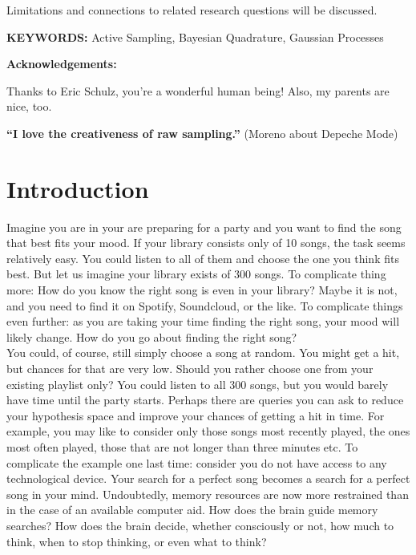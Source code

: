 \documentclass[oneside, 11pt]{book}
\begin{document}
Limitations and connections to related research questions will be discussed.\bigskip\\
\begin{center}
\textbf{KEYWORDS:} Active Sampling, Bayesian Quadrature, Gaussian Processes
\end{center}
\newpage
\vspace*{1cm}
\begin{center}
\textbf{{\LARGE Acknowledgements:}}\\
\end{center}
Thanks to Eric Schulz, you're a wonderful human being! Also, my parents are nice, too.
\newpage
\vspace*{10cm}
\begin{center}
\textbf{\Large{``I love the creativeness of raw sampling.''}} (Moreno about Depeche Mode)
\end{center}
\newpage
\tableofcontents
\newpage
\chapter{Introduction}
Imagine you are in your are preparing for a party and you want to find the song that best fits your mood. If your library consists only of 10 songs, the task seems relatively easy. You could listen to all of them and choose the one you think fits best. But let us imagine your library exists of 300 songs. To complicate thing more: How do you know the right song is even in your library? Maybe it is not, and you need to find it on Spotify, Soundcloud, or the like. To complicate things even further: as you are taking your time finding the right song, your mood will likely change. How do you go about finding the right song?\\
 
You could, of course, still simply choose a song at random. You might get a hit, but chances for that are very low. Should you rather choose one from your existing playlist only? You could listen to all 300 songs, but you would barely have time until the party starts. Perhaps there are queries you can ask to reduce your hypothesis space and improve your chances of getting a hit in time. For example, you may like to consider only those songs most recently played, the ones most often played, those that are not longer than three minutes etc. To complicate the example one last time: consider you do not have access to any technological device. Your search for a perfect song becomes a search for a perfect song in your mind. Undoubtedly, memory resources are now more restrained than in the case of an available computer aid. How does the brain guide memory searches? How does the brain decide, whether consciously or not, how much to think, when to stop thinking, or even what to think?\\
\end{document}

